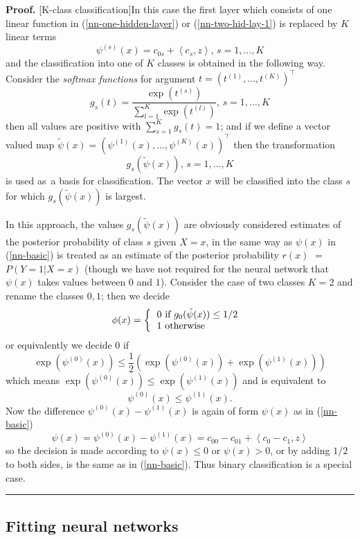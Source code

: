 \documentclass[11pt,twoside]{article}%
\theoremstyle{change}
\newenvironment{proof}[1][Proof]{\textbf{#1.} }{\ \rule{0.5em}{0.5em}}
\begin{document}
\begin{proof}
[K-class classification]In this case the first layer which consists of one
linear function in (\ref{nn-one-hidden-layer}) or (\ref{nn-two-hid-lay-1}) is
replaced by $K$ linear terms
\[
\psi^{(s)}(x)=c_{0s}+\left\langle c_{s},z\right\rangle \text{, }s=1,\ldots,K
\]
and the classification into one of $K$ classes is obtained in the following
way. Consider the \textit{softmax functions} for argument $t=(t^{(1)}%
,\ldots,t^{(K)})^{\top}$%
\begin{equation}
g_{s}(t)=\frac{\exp(t^{(s)})}{\sum_{l=1}^{K}\exp(t^{(l)})}\text{, }%
s=1,\ldots,K\label{softmax-func}%
\end{equation}
then all values are positive with $\sum_{s=1}^{K}g_{s}(t)=1$; and if we define
a vector valued map $\tilde{\psi}(x)=(\psi^{(1)}(x),\ldots,\psi^{(K)}%
(x))^{\top}$ then the transformation
\[
g_{s}(\tilde{\psi}(x))\text{, }s=1,\ldots,K
\]
is used as\ a basis for classification. The vector $x$ will be classified into
the class $s$ for which $g_{s}(\tilde{\psi}(x))$ is largest.

In this approach, the values $g_{s}(\tilde{\psi}(x))$ are obviously considered
estimates of the posterior probability of class $s$ given $X=x$, in the same
way as $\psi(x)$ in (\ref{nn-basic}) is treated as an estimate of the
posterior probability $r(x)$ $=$ $P\left(  Y=1|X=x\right)  $ (though we have
not required for the neural network that $\psi(x)$ takes values between $0$
and $1$). Consider the case of two classes $K=2$ and rename the classes $0,1$;
then we decide%
\[
\phi(x)=\left\{
\begin{tabular}
[c]{l}%
$0$ if $g_{0}(\tilde{\psi}(x))\leq1/2$\\
$1$ otherwise
\end{tabular}
\ \right.
\]
or equivalently we decide $0$ if
\[
\exp(\psi^{(0)}(x))\leq\frac{1}{2}\left(  \exp(\psi^{(0)}(x))+\exp(\psi
^{(1)}(x))\right)
\]
which means $\exp(\psi^{(0)}(x))\leq\exp(\psi^{(1)}(x))$ and is equivalent to
\[
\psi^{(0)}(x)\leq\psi^{(1)}(x).
\]
Now the difference $\psi^{(0)}(x)-\psi^{(1)}(x)$ is again of form $\psi(x) $
as in (\ref{nn-basic})
\[
\psi(x)=\psi^{(0)}(x)-\psi^{(1)}(x)=c_{00}-c_{01}+\left\langle c_{0}%
-c_{1},z\right\rangle
\]
so the decision is made according to $\psi(x)\leq0$ or $\psi(x)>0$, or by
adding $1/2$ to both sides, is the same as in (\ref{nn-basic}). Thus binary
classification is a special case.
\end{proof}

\subsection{Fitting neural networks}
\end{document}
